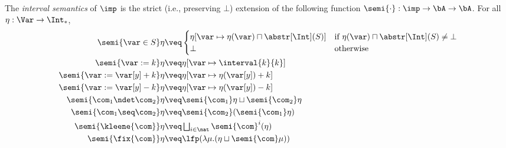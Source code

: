 \begin{definition}\label{de:intervalsem}
  The \emph{interval semantics} of \(\imp\) is the strict (i.e.,
  preserving \(\bot\))
  extension of the following function \(\semi{\cdot}: \imp \to
  \bA \to \bA\). For all \(\eta: \Var \to \Int_*\),
  \begin{align*}
    \semi{\var \in S}\eta 
    & \veq  
      \begin{cases}
        \eta[\var \mapsto \eta(\var)\sqcap \abstr[\Int](S)] & \text{if }\eta(\var)\sqcap \abstr[\Int](S)\neq \bot \\ \bot &
                                                                                                                            \text{otherwise}
      \end{cases}\\
    \semi{\var := k}\eta 
    & \veq \eta[\var \mapsto \interval{k}{k}]\\
    \semi{\var := \var[y] + k}\eta 
    & \veq \eta[\var \mapsto \eta (\var[y]) + k]\\
    \semi{\var := \var[y] - k}\eta 
    & \veq \eta[\var \mapsto \eta (\var[y]) - k]\\
    \semi{\com_1 \ndet \com_2} \eta
    & \veq \semi{\com_1} \eta \sqcup \semi{\com_2} \eta\\
    \semi{\com_1 \seq \com_2} \eta
    & \veq \semi{\com_2} (\semi{\com_1} \eta)\\
    \semi{\kleene{\com}} \eta
    & \veq \textstyle \bigsqcup_{i \in \nat} \semi{\com}^i (\eta)\\
    \semi{\fix{\com}} \eta
    & \veq  \lfp(\lambda \mu. (\eta \sqcup \semi{\com} \mu))
  \end{align*}
\end{definition}

